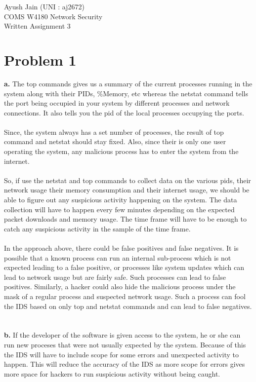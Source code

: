 \documentclass[10pt]{article}
\begin{document}
\vspace*{\fill}
\begin{Huge}
\begin{center}
Ayush Jain (UNI : aj2672)\\
COMS W4180 Network Security\\
Written Assignment 3\\
\end{center}
\end{Huge}
\vspace*{\fill}
\newpage
\section{Problem 1}
\textbf{a.} The top commands gives us a summary of the current processes running in the system along with their PIDs, \%Memory, etc whereas the netstat command tells the port being occupied in your system by different processes and network connections. It also tells you the pid of the local processes occupying the ports.\\\\
Since, the system always has a set number of processes, the result of top command and netstat should stay fixed. Also, since their is only one user operating the system, any malicious process has to enter the system from the internet.\\\\
So, if use the netstat and top commands to collect data on the various pids, their network usage their memory consumption and their internet usage, we should be able to figure out any suspicious activity happening on the system. The data collection will have to happen every few minutes depending on the expected packet downloads and memory usage. The time frame will have to be enough to catch any suspicious activity in the sample of the time frame.\\\\
In the approach above, there could be false positives and false negatives. It is possible that a known process can run an internal sub-process which is not expected leading to a false positive, or processes like system updates which can lead to network usage but are fairly safe. Such processes can lead to false positives. Similarly, a hacker could also hide the malicious process under the mask of a regular process and suspected network usage. Such a process can fool the IDS based on only top and netstat commands and can lead to false negatives.\\\\\\
\textbf{b.} If the developer of the software is given access to the system, he or she can run new proceses that were not usually expected by the system. Because of this the IDS will have to include scope for some errors and unexpected activity to happen. This will reduce the accuracy of the IDS as more scope for errors gives more space for hackers to run suspicious activity without being caught.
\end{document}
